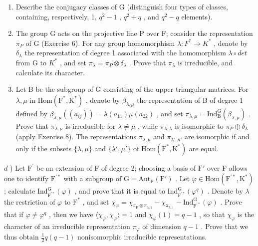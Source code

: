 \begin{enumerate}
\def\labelenumi{\alph{enumi})}
\item
  Describe the conjugacy classes of G (distinguish four types of classes, containing, respectively, 1, \(q^{2}-1\) , \(q^{2}+q\) , and \(q^{2}-q\) elements).
\item
  The group G acts on the projective line P over F; consider the representation \(\pi_{P}\) of G (Exercise 6). For any group homomorphism \(\lambda : F^{*} \to K^{*}\) , denote by \(\delta_{\lambda}\) the representation of degree 1 associated with the homomorphism \(\lambda \circ det\) from G to \(K^{*}\) , and set \(\pi_{\lambda} = \pi_{P} \otimes \delta_{\lambda}\) . Prove that \(\pi_{\lambda}\) is irreducible, and calculate its character.
\item
  Let B be the subgroup of G consisting of the upper triangular matrices. For \(\lambda,\mu\) in \(\mathrm{Hom}(\mathrm{F}^{*},\mathrm{K}^{*})\) , denote by \(\beta_{\lambda,\mu}\) the representation of B of degree 1 defined by \(\beta_{\lambda,\mu}((a_{ij}))=\lambda(a_{11})\mu(a_{22})\) , and set \(\pi_{\lambda,\mu}=\mathrm{Ind}_{\mathrm{B}}^{\mathrm{G}}(\beta_{\lambda,\mu})\) . Prove that \(\pi_{\lambda,\mu}\) is irreducible for \(\lambda\neq\mu\) , while \(\pi_{\lambda,\lambda}\) is isomorphic to \(\pi_{P}\oplus\delta_{\lambda}\) (apply Exercise 8). The representations \(\pi_{\lambda,\mu}\) and \(\pi_{\lambda',\mu'}\) are isomorphic if and only if the subsets \(\{\lambda,\mu\}\) and \(\{\lambda',\mu'\}\) of \(\mathrm{Hom}(\mathrm{F}^{*},\mathrm{K}^{*})\) are equal.
\end{enumerate}

\(d\) ) Let \(\mathrm{F}^{\prime}\) be an extension of F of degree 2; choosing a basis of \(\mathrm{F}'\) over F allows one to identify \(\mathrm{F}^{\prime *}\) with a subgroup of \(\mathrm{G} = \mathrm{Aut}_{\mathrm{F}}(\mathrm{F}')\) . Let \(\varphi \in \mathrm{Hom}(\mathrm{F}^{\prime *},\mathrm{K}^{*})\) ; calculate \(\mathrm{Ind}_{\mathrm{F}^{\prime *}}^{\mathrm{G}}(\varphi)\) , and prove that it is equal to \(\mathrm{Ind}_{\mathrm{F}^{\prime *}}^{\mathrm{G}}(\varphi^q)\) . Denote by \(\lambda\) the restriction of \(\varphi\) to \(\mathrm{F}^*\) , and set \(\chi_{\varphi} = \chi_{\pi_{\mathrm{P}}\otimes \pi_{\lambda ,1}} - \chi_{\pi_{\lambda ,1}} - \mathrm{Ind}_{\mathrm{F}^{\prime *}}^{\mathrm{G}}(\varphi)\) . Prove that if \(\varphi \neq \varphi^q\) , then we have \(\langle \chi_{\varphi},\chi_{\varphi}\rangle = 1\) and \(\chi_{\varphi}(1) = q - 1\) , so that \(\chi_{\varphi}\) is the character of an irreducible representation \(\pi_{\varphi}\) of dimension \(q - 1\) . Prove that we thus obtain \(\frac{1}{2} q(q - 1)\) nonisomorphic irreducible representations.

